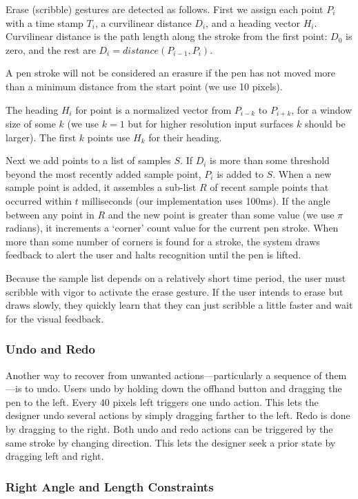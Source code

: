 \documentclass{article}
\begin{document}
Erase (scribble) gestures are detected as follows. First we assign
each point $P_i$ with a time stamp $T_i$, a curvilinear distance
$D_i$, and a heading vector $H_i$. Curvilinear distance is the path
length along the stroke from the first point: $D_0$ is zero, and the
rest are $D_i = distance(P_{i-1}, P_i)$.

A pen stroke will not be considered an erasure if the pen has not
moved more than a minimum distance from the start point (we use 10
pixels).

The heading $H_i$ for point is a normalized vector from $P_{i-k}$ to
$P_{i+k}$, for a window size of some $k$ (we use $k=1$ but for higher
resolution input surfaces $k$ should be larger). The first $k$ points
use $H_k$ for their heading.

Next we add points to a list of samples $S$. If $D_i$ is more than
some threshold beyond the most recently added sample point, $P_i$ is
added to $S$. When a new sample point is added, it assembles a
sub-list $R$ of recent sample points that occurred within $t$
milliseconds (our implementation uses 100ms). If the angle between any
point in $R$ and the new point is greater than some value (we use
$\pi$ radians), it increments a `corner' count value for the current
pen stroke. When more than some number of corners is found for a
stroke, the system draws feedback to alert the user and halts
recognition until the pen is lifted.

Because the sample list depends on a relatively short time period, the
user must scribble with vigor to activate the erase gesture. If the
user intends to erase but draws slowly, they quickly learn that they
can just scribble a little faster and wait for the visual feedback.

\subsubsection{Undo and Redo}

Another way to recover from unwanted actions---particularly a sequence
of them---is to undo. Users undo by holding down the offhand button
and dragging the pen to the left. Every 40 pixels left triggers one
undo action. This lets the designer undo several actions by simply
dragging farther to the left. Redo is done by dragging to the
right. Both undo and redo actions can be triggered by the same stroke
by changing direction. This lets the designer seek a prior state by
dragging left and right.

\subsubsection{Right Angle and Length Constraints}
\end{document}
